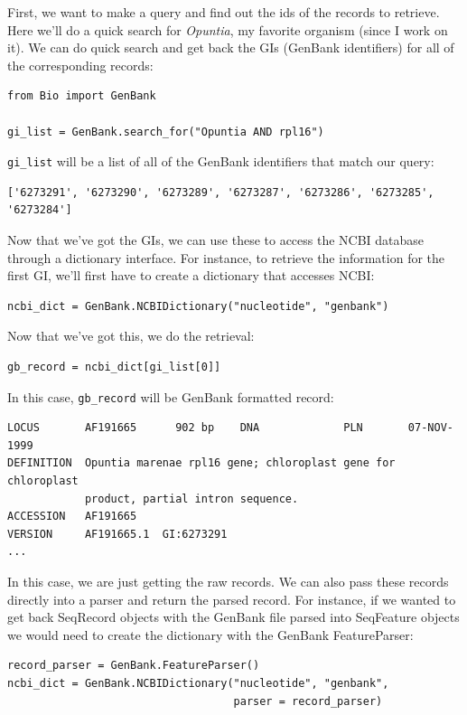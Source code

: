\documentclass{report}
\begin{document}
First, we want to make a query and find out the ids of the records to retrieve. Here we'll do a quick search for \emph{Opuntia}, my favorite organism (since I work on it). We can do quick search and get back the GIs (GenBank identifiers) for all of the corresponding records:

\begin{verbatim}
from Bio import GenBank

gi_list = GenBank.search_for("Opuntia AND rpl16")
\end{verbatim}

\verb|gi_list| will be a list of all of the GenBank identifiers that match our query:

\begin{verbatim}
['6273291', '6273290', '6273289', '6273287', '6273286', '6273285', '6273284']
\end{verbatim}

Now that we've got the GIs, we can use these to access the NCBI database through a dictionary interface. For instance, to retrieve the information for the first GI, we'll first have to create a dictionary that accesses NCBI:

\begin{verbatim}
ncbi_dict = GenBank.NCBIDictionary("nucleotide", "genbank")
\end{verbatim}

Now that we've got this, we do the retrieval:

\begin{verbatim}
gb_record = ncbi_dict[gi_list[0]]
\end{verbatim}

In this case, \verb|gb_record| will be GenBank formatted record:

\begin{verbatim}
LOCUS       AF191665      902 bp    DNA             PLN       07-NOV-1999
DEFINITION  Opuntia marenae rpl16 gene; chloroplast gene for chloroplast
            product, partial intron sequence.
ACCESSION   AF191665
VERSION     AF191665.1  GI:6273291
...
\end{verbatim}

In this case, we are just getting the raw records. We can also pass these records directly into a parser and return the parsed record. For instance, if we wanted to get back SeqRecord objects with the GenBank file parsed into SeqFeature objects we would need to create the dictionary with the GenBank FeatureParser:

\begin{verbatim}
record_parser = GenBank.FeatureParser()
ncbi_dict = GenBank.NCBIDictionary("nucleotide", "genbank",
                                   parser = record_parser)
\end{verbatim}
\end{document}

